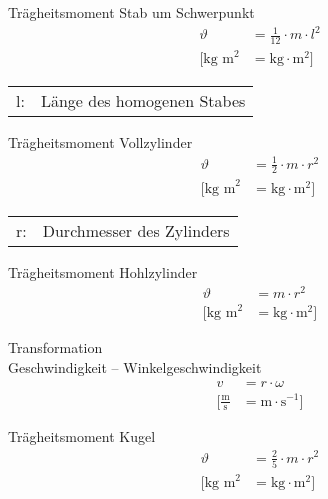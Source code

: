 \begin{karte}{Trägheitsmoment Stab um Schwerpunkt}
    \begin{align*}
        \vartheta &= \frac{1}{12} \cdot m \cdot l^2 \\
        \bigg[ \text{kg m}^2 &=
            \text{kg} \cdot \text{m}^2 
            \bigg]
    \end{align*}
    \begin{tabular}[t]{cl}
        l:& Länge des homogenen Stabes
    \end{tabular}
\end{karte}

\begin{karte}{Trägheitsmoment Vollzylinder}
    \begin{align*}
        \vartheta &= \frac{1}{2} \cdot m \cdot r^2 \\
        \bigg[ \text{kg m}^2 &=
            \text{kg} \cdot \text{m}^2 
            \bigg]
    \end{align*}
    \begin{tabular}[t]{cl}
        r:& Durchmesser des Zylinders
    \end{tabular}
\end{karte}

\begin{karte}{Trägheitsmoment Hohlzylinder}
    \begin{align*}
        \vartheta &= m \cdot r^2 \\
        \bigg[ \text{kg m}^2 &=
            \text{kg} \cdot \text{m}^2 
            \bigg]
    \end{align*}
\end{karte}

\begin{karte}{Transformation \\ Geschwindigkeit -- Winkelgeschwindigkeit}
    \begin{align*}
        v &= r \cdot \omega \\
        \bigg[ \frac{\text{m}}{\text{s}} &= 
            \text{m} \cdot \text{s}^{-1}
            \bigg]
    \end{align*}
\end{karte}

\begin{karte}{Trägheitsmoment Kugel}
    \begin{align*}
        \vartheta &= \frac{2}{5} \cdot m \cdot r^2 \\
        \bigg[ \text{kg m}^2 &=
            \text{kg} \cdot \text{m}^2 
            \bigg]
    \end{align*}
\end{karte}


